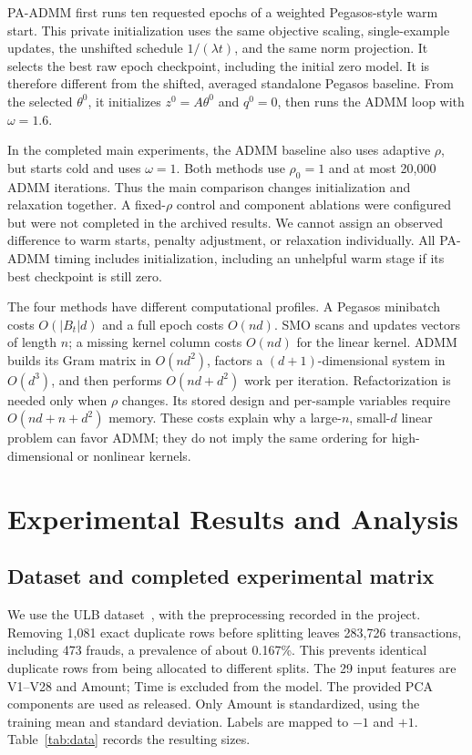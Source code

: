 \documentclass{article}
\begin{document}
PA-ADMM first runs ten requested epochs of a weighted Pegasos-style warm start. This private initialization uses the same objective scaling, single-example updates, the unshifted schedule $1/(\lambda t)$, and the same norm projection. It selects the best raw epoch checkpoint, including the initial zero model. It is therefore different from the shifted, averaged standalone Pegasos baseline. From the selected $\theta^0$, it initializes $z^0=A\theta^0$ and $q^0=0$, then runs the ADMM loop with $\omega=1.6$.

In the completed main experiments, the ADMM baseline also uses adaptive $\rho$, but starts cold and uses $\omega=1$. Both methods use $\rho_0=1$ and at most 20,000 ADMM iterations. Thus the main comparison changes initialization and relaxation together. A fixed-$\rho$ control and component ablations were configured but were not completed in the archived results. We cannot assign an observed difference to warm starts, penalty adjustment, or relaxation individually. All PA-ADMM timing includes initialization, including an unhelpful warm stage if its best checkpoint is still zero.

The four methods have different computational profiles. A Pegasos minibatch costs $O(|B_t|d)$ and a full epoch costs $O(nd)$. SMO scans and updates vectors of length $n$; a missing kernel column costs $O(nd)$ for the linear kernel. ADMM builds its Gram matrix in $O(nd^2)$, factors a $(d+1)$-dimensional system in $O(d^3)$, and then performs $O(nd+d^2)$ work per iteration. Refactorization is needed only when $\rho$ changes. Its stored design and per-sample variables require $O(nd+n+d^2)$ memory. These costs explain why a large-$n$, small-$d$ linear problem can favor ADMM; they do not imply the same ordering for high-dimensional or nonlinear kernels.

\section{Experimental Results and Analysis}
\label{sec:experiments}

\subsection{Dataset and completed experimental matrix}

We use the ULB dataset~\citep{ulb}, with the preprocessing recorded in the project. Removing 1,081 exact duplicate rows before splitting leaves 283,726 transactions, including 473 frauds, a prevalence of about 0.167\%. This prevents identical duplicate rows from being allocated to different splits. The 29 input features are V1--V28 and Amount; Time is excluded from the model. The provided PCA components are used as released. Only Amount is standardized, using the training mean and standard deviation. Labels are mapped to $-1$ and $+1$. Table~\ref{tab:data} records the resulting sizes.
\end{document}
